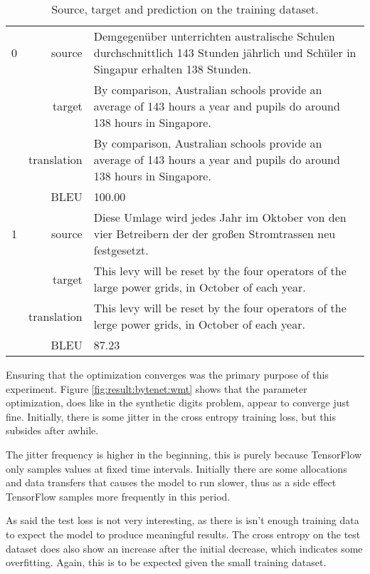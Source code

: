 \begin{table}[h]
\centering
\begin{tabular}{l|r|p{10cm}}
  0 & source & Demgegenüber unterrichten australische Schulen durchschnittlich 143 Stunden jährlich und Schüler in Singapur erhalten 138 Stunden. \\[0.1cm]
    & target & By comparison, Australian schools provide an average of 143 hours a year and pupils do around 138 hours in Singapore. \\[0.1cm]
    & translation & By comparison, Australian schools provide an average of 143 hours a year and pupils do around 138 hours in Singapore. \\[0.1cm]
    & BLEU & 100.00 \\[0.1cm] \hline
  1 & source & Diese Umlage wird jedes Jahr im Oktober von den vier Betreibern der der großen Stromtrassen neu festgesetzt. \\[0.1cm]
    & target & This levy will be reset by the four operators of the large power grids, in October of each year. \\[0.1cm]
    & translation & This levy will be reset by the four operators of the lerge power grids, in October of each year. \\[0.1cm]
    & BLEU & 87.23
\end{tabular}
\caption{Source, target and prediction on the training dataset.}
\label{table:result:bytenet:wmt-train}
\end{table}

Ensuring that the optimization converges was the primary purpose of this experiment. Figure \ref{fig:result:bytenet:wmt} shows that the parameter optimization, does like in the synthetic digits problem, appear to converge just fine. Initially, there is some jitter in the cross entropy training loss, but this subsides after awhile.

The jitter frequency is higher in the beginning, this is purely because TensorFlow only samples values at fixed time intervals. Initially there are some allocations and data transfers that causes the model to run slower, thus as a side effect TensorFlow samples more frequently in this period. 

As said the test loss is not very interesting, as there is isn't enough training data to expect the model to produce meaningful results. The cross entropy on the test dataset does also show an increase after the initial decrease, which indicates some overfitting. Again, this is to be expected given the small training dataset.

